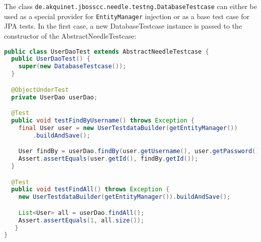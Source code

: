 The class \verb|de.akquinet.jbosscc.needle.testng.DatabaseTestcase| can either be used as a special provider for \verb|EntityManager| injection or as a base test case for JPA tests.
In the first case, a new DatabaseTestcase instance is passed to the constructor of the AbstractNeedleTestcase:

\begin{lstlisting}[language={JAVA},caption=TestNG User DAO test]
public class UserDaoTest extends AbstractNeedleTestcase {
  public UserDaoTest() {
    super(new DatabaseTestcase());
  }

  @ObjectUnderTest
  private UserDao userDao;

  @Test
  public void testFindByUsername() throws Exception {
    final User user = new UserTestdataBuilder(getEntityManager())
        .buildAndSave();

    User findBy = userDao.findBy(user.getUsername(), user.getPassword());
    Assert.assertEquals(user.getId(), findBy.getId());
  }

  @Test
  public void testFindAll() throws Exception {
    new UserTestdataBuilder(getEntityManager()).buildAndSave();

    List<User> all = userDao.findAll();
    Assert.assertEquals(1, all.size());
   }
}
\end{lstlisting}
